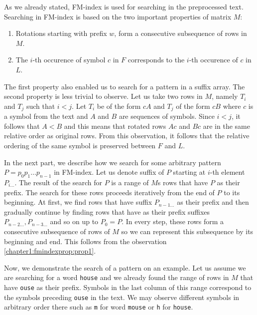 As we already stated, FM-index is used for searching in the preprocessed text.
Searching in FM-index is based on the two important properties of matrix $M$:

\begin{enumerate}
	\item Rotations starting with prefix $w$, form a consecutive subsequence of rows in $M$.
	\label{chapter1:fmindexprop:prop1}
	\item The $i$-th occurence of symbol $c$ in $F$ corresponds to the $i$-th occurence of $c$ in~$L$.
	\label{chapter1:fmindexprop:prop2}
\end{enumerate}

The first property also enabled us to search for a pattern in a suffix array. The second
property is less trivial to observe. Let us take two rows in $M$, namely $T_i$ and $T_j$
such that $i<j$. Let $T_i$ be of the form $cA$ and $T_j$ of the form $cB$ where $c$ is a
symbol from the text and $A$ and $B$ are sequences of symbols. Since $i<j$, it follows that
$A<B$ and this means that rotated rows $Ac$ and $Bc$ are in the same relative order as original rows.
From this observation, it follows that the relative ordering of the same symbol is preserved
between $F$ and $L$.

In the next part, we describe how we search for some arbitrary pattern $P=p_0p_1\ldots p_{n-1}$
in FM-index. Let us denote suffix of $P$ starting at $i$-th element $P_{i\ldots}$. The result of
the search for $P$ is a range of $M$s rows that have $P$ as their prefix. The search for these
rows proceeds iteratively from the end of $P$ to its beginning. At first, we find rows that have suffix
$P_{n-1\ldots}$ as their prefix and then gradually continue by finding rows that have as their prefix
suffixes $P_{n-2\ldots}, P_{n-3\ldots}$ and so on up to $P_0=P$. In every step, these rows form a consecutive
subsequence of rows of $M$ so we can represent this subsequence by its beginning and end. This follows
from the observation \ref{chapter1:fmindexprop:prop1}.

Now, we demonstrate the search of a pattern on an example. Let us assume we are searching for a word
{\tt house} and we already found the range of rows in $M$ that have {\tt ouse}
as their prefix. Symbols in the last column of this range correspond to the symbols
preceding {\tt ouse} in the text. We may observe different symbols in arbitrary order there such as {\tt m}
for word {\tt mouse} or {\tt h} for {\tt house}.

